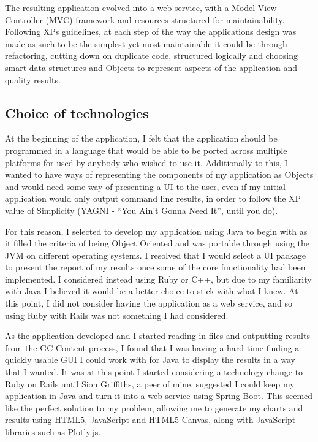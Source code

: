 The resulting application evolved into a web service, with a Model View Controller (MVC) framework and resources structured for maintainability. Following XPs guidelines, at each step of the way the applications design was made as such to be the simplest yet most maintainable it could be through refactoring, cutting down on duplicate code, structured logically and choosing smart data structures and Objects to represent aspects of the application and quality results.

\subsection{Choice of technologies}
At the beginning of the application, I felt that the application should be programmed in a language that would be able to be ported across multiple platforms for used by anybody who wished to use it. Additionally to this, I wanted to have ways of representing the components of my application as Objects and would need some way of presenting a UI to the user, even if my initial application would only output command line results, in order to follow the XP value of Simplicity (YAGNI - ``You Ain't Gonna Need It'', until you do).

For this reason, I selected to develop my application using Java to begin with as it filled the criteria of being Object Oriented and was portable through using the JVM on different operating systems. I resolved that I would select a UI package to present the report of my results once some of the core functionality had been implemented. I considered instead using Ruby or C++, but due to my familiarity with Java I believed it would be a better choice to stick with what I knew. At this point, I did not consider having the application as a web service, and so using Ruby with Rails was not something I had considered.

As the application developed and I started reading in files and outputting results from the GC Content process, I found that I was having a hard time finding a quickly usable GUI I could work with for Java to display the results in a way that I wanted. It was at this point I started considering a technology change to Ruby on Rails until Sion Griffiths, a peer of mine, suggested I could keep my application in Java and turn it into a web service using Spring Boot\cite{springboot}. This seemed like the perfect solution to my problem, allowing me to generate my charts and results using HTML5, JavaScript and HTML5 Canvas, along with JavaScript libraries such as  Plotly.js.

